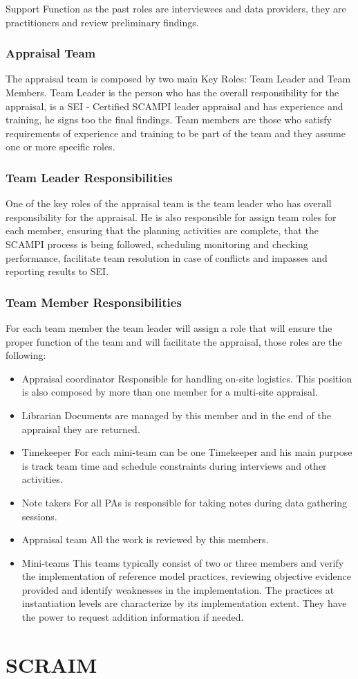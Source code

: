Support Function as the past roles are interviewees and data providers, they are practitioners and review preliminary findings.

\subsubsection{Appraisal Team}

The appraisal team is composed by two main Key Roles: Team Leader and Team Members.
Team Leader is the person who has the overall responsibility for the appraisal, is a SEI - Certified SCAMPI leader appraisal and has experience and training, he signs too the final findings.
Team members are those who satisfy requirements of  experience and training to be part of the team and they assume one or more specific roles.

\subsubsection{Team Leader Responsibilities}

One of the key roles of the appraisal team is the team leader who has overall responsibility for the appraisal. He is also responsible for assign team roles for each member, ensuring that the planning activities are complete, that the SCAMPI process is being followed, scheduling monitoring and checking performance, facilitate team resolution in case of conflicts and impasses and reporting results to SEI.

\subsubsection{Team Member Responsibilities}
For each team member the team leader will assign a role that will ensure the proper function of the team and will facilitate the appraisal, those roles are the following:
\begin{itemize}
	\item Appraisal coordinator
	\subitem Responsible for handling on-site logistics. This position is also composed by more than one member for a multi-site appraisal.
	\item Librarian
	\subitem Documents are managed by this member and in the end of the appraisal they are returned.
	\item Timekeeper
	\subitem For each mini-team can be one Timekeeper and his main purpose is track team time and schedule constraints during interviews and other activities.
	\item Note takers
	\subitem For all PAs is responsible for taking notes during data gathering sessions.
	\item Appraisal team
	\subitem All the work is reviewed by this members.
	\item Mini-teams
	\subitem This teams typically consist of two or three members and verify the implementation of reference model practices, reviewing objective evidence provided and identify weaknesses in the implementation. The practices at instantiation levels are characterize by its implementation extent. They have the power to request addition information if needed. 
\end{itemize}


\section{SCRAIM}